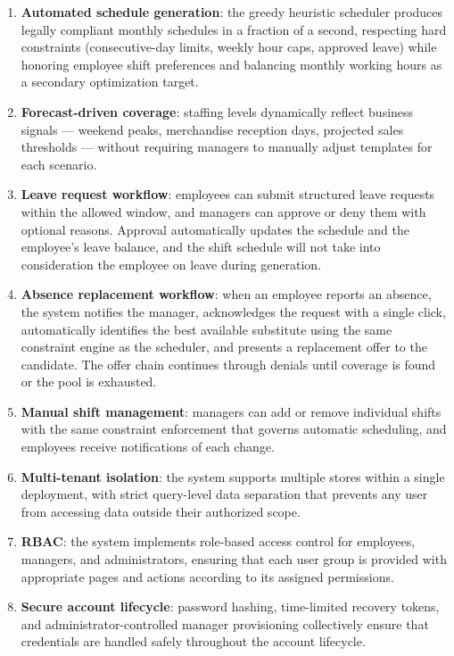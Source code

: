 \begin{enumerate}
    \item \textbf{Automated schedule generation}: the greedy heuristic scheduler produces legally compliant monthly schedules in a fraction of a second, respecting hard constraints (consecutive-day limits, weekly hour caps, approved leave) while honoring employee shift preferences and balancing monthly working hours as a secondary optimization target.
    \item \textbf{Forecast-driven coverage}: staffing levels dynamically reflect business signals — weekend peaks, merchandise reception days, projected sales thresholds — without requiring managers to manually adjust templates for each scenario.
    \item \textbf{Leave request workflow}: employees can submit structured leave requests within the allowed window, and managers can approve or deny them with optional reasons. Approval automatically updates the schedule and the employee's leave balance, and the shift schedule will not take into consideration the employee on leave during generation.
    \item \textbf{Absence replacement workflow}: when an employee reports an absence, the system notifies the manager, acknowledges the request with a single click, automatically identifies the best available substitute using the same constraint engine as the scheduler, and presents a replacement offer to the candidate. The offer chain continues through denials until coverage is found or the pool is exhausted.
    \item \textbf{Manual shift management}: managers can add or remove individual shifts with the same constraint enforcement that governs automatic scheduling, and employees receive notifications of each change.
    \item \textbf{Multi-tenant isolation}: the system supports multiple stores within a single deployment, with strict query-level data separation that prevents any user from accessing data outside their authorized scope.
    \item \textbf{RBAC}: the system implements role-based access control for employees, managers, and administrators, ensuring that each user group is provided with appropriate pages and actions according to its assigned permissions.
    
    \item \textbf{Secure account lifecycle}: password hashing, time-limited recovery tokens, and administrator-controlled manager provisioning collectively ensure that credentials are handled safely throughout the account lifecycle.
\end{enumerate}


